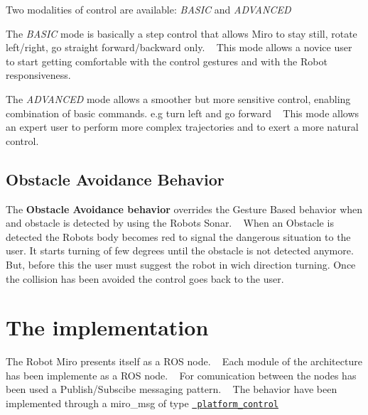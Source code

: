  Two modalities of control are available\+: {\itshape B\+A\+S\+IC} and {\itshape A\+D\+V\+A\+N\+C\+ED} 
\begin{DoxyItemize}
\item The {\itshape B\+A\+S\+IC} mode is basically a step control that allows Miro to stay still, rotate left/right, go straight forward/backward only. ~\newline
 This mode allows a novice user to start getting comfortable with the control gestures and with the Robot responsiveness. 
\item The {\itshape A\+D\+V\+A\+N\+C\+ED} mode allows a smoother but more sensitive control, enabling combination of basic commands. e.\+g turn left and go forward ~\newline
 This mode allows an expert user to perform more complex trajectories and to exert a more natural control.
\end{DoxyItemize}\hypertarget{index_aob_sec}{}\subsection{Obstacle Avoidance Behavior}\label{index_aob_sec}
The {\bfseries{Obstacle Avoidance behavior}} overrides the Gesture Based behavior when and obstacle is detected by using the Robot\textquotesingle{}s Sonar. ~\newline
 When an Obstacle is detected the Robot\textquotesingle{}s body becomes red to signal the dangerous situation to the user. It starts turning of few degrees until the obstacle is not detected anymore. ~\newline
 But, before this the user must suggest the robot in wich direction turning. Once the collision has been avoided the control goes back to the user.  \hypertarget{index_det_sec}{}\section{The implementation}\label{index_det_sec}
The Robot Miro presents itself as a R\+OS node. ~\newline
 Each module of the architecture has been implemente as a R\+OS node. ~\newline
 For comunication between the nodes has been used a Publish/\+Subscibe messaging pattern. ~\newline
 The behavior have been implemented through a miro\+\_\+msg of type \href{https://consequential.bitbucket.io/platform_control.msg}\texttt{ platform\+\_\+control} ~\newline

